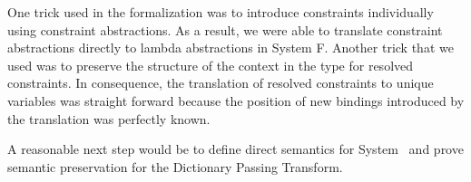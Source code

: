 \noindent One trick used in the formalization was to introduce constraints individually using constraint abstractions. As a result, we were able to translate constraint abstractions directly to lambda abstractions in System F. Another trick that we used was to preserve the structure of the context in the type for resolved constraints. In consequence, the translation of resolved constraints to unique variables was straight forward because the position of new bindings introduced by the translation was perfectly known.   

\noindent A reasonable next step would be to define direct semantics for System \Fo\ and prove semantic preservation for the Dictionary Passing Transform. 